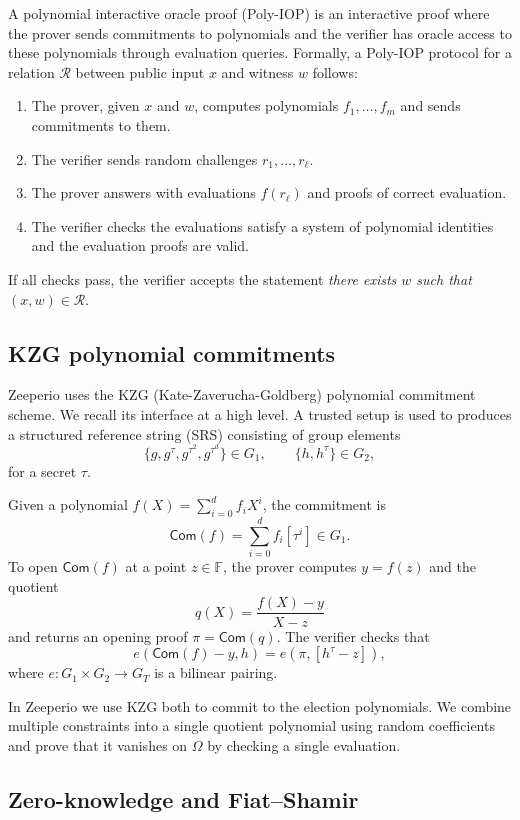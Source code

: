 \documentclass{llncs}
\begin{document}
A polynomial interactive oracle proof (Poly-IOP) is an interactive proof where the prover sends commitments to polynomials and the verifier has oracle access to these polynomials through evaluation queries.
Formally, a Poly-IOP protocol for a relation $\mathcal{R}$ between public input $x$ and witness $w$ follows:
\begin{enumerate}[label=(\roman*)]
  \item The prover, given $x$ and $w$, computes polynomials $f_1,\dots,f_m$ and sends commitments to them.
  \item The verifier sends random challenges $r_1,\dots,r_\ell$.
  \item The prover answers with evaluations $f(r_\ell)$ and proofs of correct evaluation.
  \item The verifier checks the evaluations satisfy a system of polynomial identities and the evaluation proofs are valid.
\end{enumerate}
If all checks pass, the verifier accepts the statement \emph{there exists $w$ such that $(x,w) \in \mathcal{R}$}.

\subsection{KZG polynomial commitments}

Zeeperio uses the KZG (Kate-Zaverucha-Goldberg) polynomial commitment scheme.
We recall its interface at a high level.
A trusted setup is used to produces a structured reference string (SRS) consisting of group elements
\[
  \{g, g^\tau, g^{\tau^2}, g^{\tau^d}\} \in G_1, \qquad \{h, h^\tau\} \in G_2,
\]
for a secret $\tau$.

Given a polynomial $f(X) = \sum_{i=0}^d f_i X^i$, the commitment is
\[
  \mathsf{Com}(f) = \sum_{i=0}^d f_i [\tau^i] \in G_1.
\]
To open $\mathsf{Com}(f)$ at a point $z \in \mathbb{F}$, the prover computes $y = f(z)$ and the quotient
\[
  q(X) = \frac{f(X) - y}{X - z}
\]
and returns an opening proof $\pi = \mathsf{Com}(q)$.
The verifier checks that
\[
  e(\mathsf{Com}(f) - y, h) = e(\pi, [h^\tau - z]),
\]
where $e : G_1 \times G_2 \to G_T$ is a bilinear pairing.

In Zeeperio we use KZG both to commit to the election polynomials.
We combine multiple constraints into a single quotient polynomial using random coefficients and prove that it vanishes on $\Omega$ by checking a single evaluation.

\subsection{Zero-knowledge and Fiat--Shamir}
\end{document}
